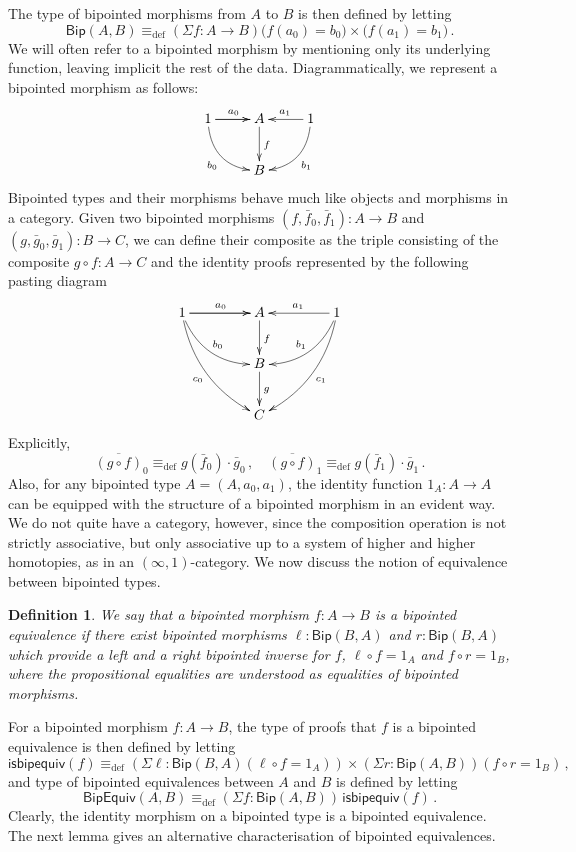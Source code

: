 \documentclass[reqno,10pt,a4paper,oneside]{amsart}
\numberwithin{equation}{section}
\theoremstyle{mythm}
\theoremstyle{mydef}
\newtheorem{definition}[theorem]{Definition}
\theoremstyle{myrmk}
\newcommand{\ie}{\text{i.e.\ }}
\newcommand{\myemph}[1]{\textit{#1}}
\newcommand{\deq}{\equiv}
\newcommand{\defeq}{\deq_{\mathrm{def}}}
\newcommand{\co}{\colon}
\newcommand{\BipHom}{\mathsf{Bip}}
\newcommand{\isbipequiv}{\mathsf{isbipequiv}}
\newcommand{\BipEquiv}{\mathsf{BipEquiv}}
\begin{document}
The type of bipointed morphisms from $A$ to $B$ is then defined by letting
\[
\BipHom(A,B) \defeq (\Sigma f \co A \to B) \big(  f(a_0) =  b_0 \big)  \times \big(  f(a_1) = b_1 \big) \, .
\]
We will often refer to a bipointed morphism by mentioning only its underlying function, leaving implicit
the rest of the data. Diagrammatically, we represent a bipointed morphism as follows:
\[
\xymatrix{
1 \ar[r]   \ar[r]^{a_0} \ar@/_1pc/[dr]_{b_0}  & A  \ar[d]^{f} & 1  \ar[l]_{a_1} \ar@/^1pc/[dl]^{b_1} \\
  & B  &  }
 \]
Bipointed types and their morphisms behave much like objects and morphisms in a category.
Given two bipointed morphisms  $(f, \bar{f}_0, \bar{f}_1) \co A \to B$ and $(g, \bar{g}_0, \bar{g}_1) \co B \to C$, we can define their composite 
 as the triple consisting of the composite $g \circ f \co A \to C$ and the identity proofs represented
by the following pasting diagram
\[
\xymatrix@C=1.5cm{
1 \ar[r]   \ar[r]^{a_0}   \ar@/_1pc/[dr]^{b_0} \ar@/_1pc/[ddr]_{c_0}  & A  \ar[d]^{f} & 1 \ar[l]_{a_1}  \ar@/^1pc/[dl]_{b_1}  \ar@/^1pc/[ddl]^{c_1} \\
  & B \ar[d]^g &   \\
  & C &   }
  \]
Explicitly,
\[
\overline{(g \circ f)}_0 \defeq g(\bar{f}_0) \cdot  \bar{g}_0 \, ,   \quad 
\overline{(g \circ f) }_1 \defeq  g(\bar{f}_1) \cdot   \bar{g}_1 \, .
\]
Also, for any bipointed type $A = (A, a_0, a_1)$, the identity function $1_A \co A \to A$ can be equipped with the structure of a 
bipointed morphism in an evident way. 
We do not quite have a category, however, since the composition operation is not strictly associative, but only associative up to a system of higher and higher 
homotopies, as in an $(\infty,1)$-category.  We now discuss the notion of equivalence between bipointed types.



\begin{definition} We say that a bipointed morphism $f \co A \to B$ is a \myemph{bipointed equivalence}
if there exist bipointed morphisms $\ell \co \BipHom(B,A)$ and $r \co \BipHom(B,A)$ which provide a left and a right bipointed inverse for $f$, \ie  $\ell \circ f = 1_A$ and $f \circ r = 1_B$, 
where the propositional equalities are understood as equalities of bipointed morphisms. 
\end{definition}

For a bipointed morphism $f \co A \to B$, the type of proofs that $f$ is a bipointed equivalence is
then defined by letting
\[
\isbipequiv(f) \defeq   ( \Sigma \ell : \BipHom(B,A) ( \ell \circ f = 1_A )) \times 
    (\Sigma r : \BipHom(A, B))(  f \circ r = 1_B ) \, ,
\]
and type of bipointed equivalences between $A$ and $B$ is defined by letting
\[
\BipEquiv(A, B)
\defeq    
(\Sigma f : \BipHom(A,B)) \, \isbipequiv(f)  \, . 
\] 
Clearly, the identity morphism on a bipointed type is a bipointed equivalence. The next lemma
gives an alternative characterisation of bipointed equivalences.
\end{document}
